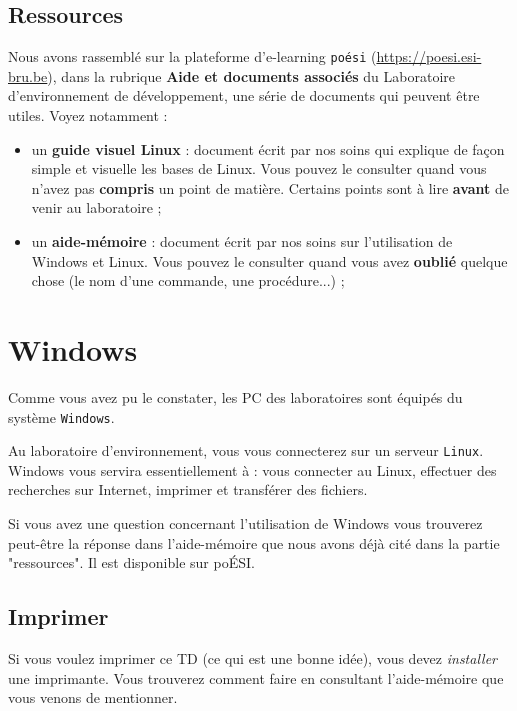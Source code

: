 \documentclass[a4paper,11pt]{article}
\begin{document}
\subsection{Ressources}
Nous avons rassemblé sur la plateforme d'e-learning \verb_poési_ (\url{https://poesi.esi-bru.be}), dans la rubrique \textbf{Aide et documents associés} du Laboratoire d'environnement de développement, une série de documents qui peuvent être utiles. Voyez notamment :
\par
\begin{itemize}
\item un \textbf{guide visuel Linux} : document écrit par nos soins qui explique de façon simple et visuelle les bases de Linux. Vous pouvez le consulter quand vous n'avez pas \textbf{compris} un point de matière. Certains points sont à lire \textbf{avant} de venir au laboratoire ;
\item un \textbf{aide-mémoire} : document écrit par nos soins sur l'utilisation de Windows et Linux. Vous pouvez le consulter quand vous avez \textbf{oublié} quelque chose (le nom d'une commande, une procédure...) ;
\end{itemize}


\section{Windows}

Comme vous avez pu le constater, les PC des laboratoires sont équipés du système \verb_Windows_.
\par			
Au laboratoire d'environnement, vous vous connecterez sur un serveur \verb_Linux_. Windows vous servira essentiellement à : vous connecter au Linux, 
effectuer des recherches sur Internet, imprimer et transférer des fichiers.
\par
Si vous avez une question concernant l'utilisation de Windows vous trouverez peut-être la réponse dans l'aide-mémoire que nous avons déjà cité dans la partie "ressources". Il est disponible sur poÉSI. 
\par		

\subsection{Imprimer}
Si vous voulez imprimer ce TD (ce qui est une bonne idée), vous devez \textit{installer} une imprimante. Vous trouverez comment faire en consultant l'aide-mémoire que vous venons de mentionner.
\par
\end{document}
